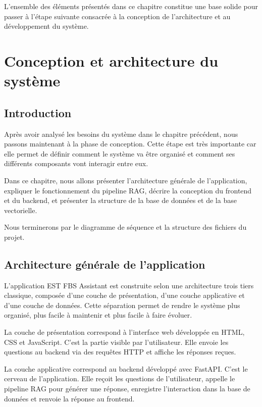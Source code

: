 \documentclass[12pt, a4paper, twoside]{report}
\begin{document}
L’ensemble des éléments présentés dans ce chapitre constitue une base solide pour passer à l’étape suivante consacrée à la conception de l’architecture et au développement du système.



\chapter{Conception et architecture du système}

\section{Introduction}
Après avoir analysé les besoins du système dans le chapitre précédent, nous passons maintenant à la phase de conception. Cette étape est très importante car elle permet de définir comment le système va être organisé et comment ses différents composants vont interagir entre eux. 

Dans ce chapitre, nous allons présenter l'architecture générale de l'application, expliquer le fonctionnement du pipeline RAG, décrire la conception du frontend et du backend, et présenter la structure de la base de données et de la base vectorielle. 

Nous terminerons par le diagramme de séquence et la structure des fichiers du projet.

\newpage
\section{Architecture générale de l'application}

L'application EST FBS Assistant est construite selon une architecture trois tiers \newline classique, composée d'une couche de présentation, d'une couche applicative et d'une couche de données. Cette séparation permet de rendre le système plus organisé, plus facile à maintenir et plus facile à faire évoluer.

La couche de présentation correspond à l'interface web développée en HTML, CSS et JavaScript. C'est la partie visible par l'utilisateur. Elle envoie les questions au backend via des requêtes HTTP et affiche les réponses reçues.

La couche applicative correspond au backend développé avec FastAPI. C'est le cerveau de l'application. Elle reçoit les questions de l'utilisateur, appelle le pipeline RAG pour générer une réponse, enregistre l'interaction dans la base de données et renvoie la réponse au frontend.
\end{document}
